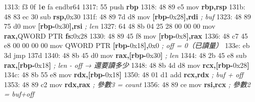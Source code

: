 \documentclass[10pt,a4paper]{article}
\newenvironment{Shaded}{\begin{snugshade}}{\end{snugshade}}
\newcommand{\BaseNTok}[1]{\textcolor[rgb]{0.00,0.00,0.81}{#1}}
\newcommand{\BuiltInTok}[1]{#1}
\newcommand{\CommentTok}[1]{\textcolor[rgb]{0.56,0.35,0.01}{\textit{#1}}}
\newcommand{\DataTypeTok}[1]{\textcolor[rgb]{0.13,0.29,0.53}{#1}}
\newcommand{\DecValTok}[1]{\textcolor[rgb]{0.00,0.00,0.81}{#1}}
\newcommand{\ErrorTok}[1]{\textcolor[rgb]{0.64,0.00,0.00}{\textbf{#1}}}
\newcommand{\FloatTok}[1]{\textcolor[rgb]{0.00,0.00,0.81}{#1}}
\newcommand{\KeywordTok}[1]{\textcolor[rgb]{0.13,0.29,0.53}{\textbf{#1}}}
\newcommand{\NormalTok}[1]{#1}
\newcommand{\OperatorTok}[1]{\textcolor[rgb]{0.81,0.36,0.00}{\textbf{#1}}}
\renewenvironment{Shaded}{%
  \def\FrameCommand{\fboxsep=3.2pt\colorbox{shadecolor}}%
  \MakeFramed{\advance\hsize-\width\FrameRestore\small}%
}{%
  \endMakeFramed
}
\begin{document}
\begin{Shaded}
\begin{Highlighting}[]
\NormalTok{1313: f3 }\FloatTok{0}\BaseNTok{f} \DecValTok{1}\ErrorTok{e}\NormalTok{ fa            endbr64}
\NormalTok{1317: 55                     }\BuiltInTok{push}   \KeywordTok{rbp}
\NormalTok{1318: 48 89 e5               mov    }\KeywordTok{rbp}\OperatorTok{,}\KeywordTok{rsp}
\NormalTok{131b: 48 83 ec }\DecValTok{30}\NormalTok{            sub    }\KeywordTok{rsp}\OperatorTok{,}\BaseNTok{0x30}
\NormalTok{131f: 48 89 7d d8            mov    }\OperatorTok{[}\KeywordTok{rbp}\OperatorTok{{-}}\BaseNTok{0x28}\OperatorTok{],}\KeywordTok{rdi}        \CommentTok{; buf}
\NormalTok{1323: 48 89 75 d0            mov    }\OperatorTok{[}\KeywordTok{rbp}\OperatorTok{{-}}\BaseNTok{0x30}\OperatorTok{],}\KeywordTok{rsi}        \CommentTok{; len}
\NormalTok{1327: 64 48 8b 04 25 28 00 00 00   }\BuiltInTok{mov} \KeywordTok{rax}\OperatorTok{,}\DataTypeTok{QWORD} \DataTypeTok{PTR} \KeywordTok{fs}\OperatorTok{:}\BaseNTok{0x28}
\NormalTok{1330: 48 89 45 f8            mov    }\OperatorTok{[}\KeywordTok{rbp}\OperatorTok{{-}}\BaseNTok{0x8}\OperatorTok{],}\KeywordTok{rax}
\NormalTok{1336: 48 c7 }\DecValTok{45}\NormalTok{ e8 }\DecValTok{00} \DecValTok{00} \DecValTok{00} \DecValTok{00}\NormalTok{  mov }\DataTypeTok{QWORD} \DataTypeTok{PTR} \OperatorTok{[}\KeywordTok{rbp}\OperatorTok{{-}}\BaseNTok{0x18}\OperatorTok{],}\BaseNTok{0x0}  \CommentTok{; off = 0（已讀量）}
\NormalTok{133e: eb }\DecValTok{3}\BaseNTok{d}\NormalTok{                  jmp    }\DecValTok{137}\BaseNTok{d}
\NormalTok{1340: 48 8b 45 d0            mov    }\KeywordTok{rax}\OperatorTok{,[}\KeywordTok{rbp}\OperatorTok{{-}}\BaseNTok{0x30}\OperatorTok{]}        \CommentTok{; len}
\NormalTok{1344: 48 2b 45 e8            sub    }\KeywordTok{rax}\OperatorTok{,[}\KeywordTok{rbp}\OperatorTok{{-}}\BaseNTok{0x18}\OperatorTok{]}        \CommentTok{; len {-} off  → 還要讀多少}
\NormalTok{1348: 48 8b 4d d8            mov    }\KeywordTok{rcx}\OperatorTok{,[}\KeywordTok{rbp}\OperatorTok{{-}}\BaseNTok{0x28}\OperatorTok{]}
\NormalTok{134c: 48 8b 55 e8            mov    }\KeywordTok{rdx}\OperatorTok{,[}\KeywordTok{rbp}\OperatorTok{{-}}\BaseNTok{0x18}\OperatorTok{]}
\NormalTok{1350: 48 01 d1               add    }\KeywordTok{rcx}\OperatorTok{,}\KeywordTok{rdx}               \CommentTok{; buf + off}
\NormalTok{1353: 48 89 c2               mov    }\KeywordTok{rdx}\OperatorTok{,}\KeywordTok{rax}               \CommentTok{; 參數3 = count}
\NormalTok{1356: 48 89 ce               mov    }\KeywordTok{rsi}\OperatorTok{,}\KeywordTok{rcx}               \CommentTok{; 參數2 = buf+off}

\end{Highlighting}
\end{Shaded}
\end{document}
